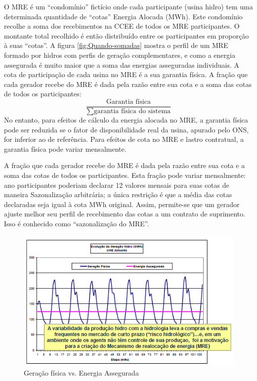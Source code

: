 O MRE é um \textquotedblleft condomínio\textquotedblright{} fictício
onde cada participante (usina hidro) tem uma determinada quantidade
de \textquotedblleft cotas\textquotedblright{} Energia Alocada (MWh).
Este condomínio recolhe a soma dos recebimentos na CCEE de todos os
MRE participantes. O montante total recolhido é então distribuído
entre os participantes em proporção à suas \textquotedblleft cotas\textquotedblright .
A figura \ref{fig:Quando-somadas} mostra o perfil de um MRE formado
por hidros com perfis de geração complementares, e como a energia
assegurada é muito maior que a soma das energias asseguradas individuais.
A cota de participação de cada usina no MRE é a sua garantia física.
A fração que cada gerador recebe do MRE é dada pela razão entre sua
cota e a soma das cotas de todos os participantes: 
\[
\dfrac{\mbox{Garantia física}}{\sum\mbox{garantia física do sistema}}
\]
No entanto, para efeitos de cálculo da energia alocada no MRE, a garantia
física pode ser reduzida se o fator de disponibilidade real da usina,
apurado pelo ONS, for inferior ao de referência. Para efeitos de cota
no MRE e lastro contratual, a garantia física pode variar mensalmente.

A fração que cada gerador recebe do MRE é dada pela razão entre sua
cota e a soma das cotas de todos os participantes. Esta fração pode
variar mensalmente: ano participantes poderiam declarar 12 valores
mensais para suas cotas de maneira Sazonalização arbitrária; a única
restrição é que a média das cotas declaradas seja igual à cota MWh
original. Assim, permite-se que um gerador ajuste melhor seu perfil
de recebimento das cotas a um contrato de suprimento. Isso é conhecido
como \textquotedblleft sazonalização do MRE\textquotedblright .

\begin{figure}
\centering{}\includegraphics{anexos/aula110-6}\protect\caption{Geração física vs. Energia Assegurada\label{fig:Gera=0000E7=0000E3o-f=0000EDsica-vs.}}
\end{figure}


